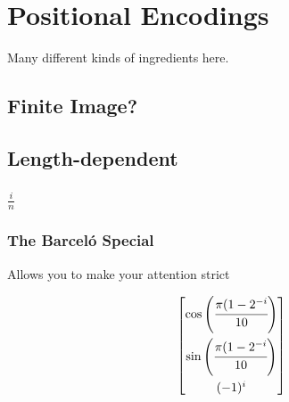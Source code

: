 %
\chapter{Positional Encodings}
%

Many different kinds of ingredients here.

\section{Finite Image?}

\section{Length-dependent}

\subsection{$\frac{i}{n}$}

\subsection{The Barceló Special}

Allows you to make your attention strict

\[\begin{bmatrix}
    \cos\left(\cfrac{\pi(1-2^{-i}}{10}\right)\\[3ex]
    \sin\left(\cfrac{\pi(1-2^{-i}}{10}\right)\\[3ex]
    (-1)^i
\end{bmatrix}\]